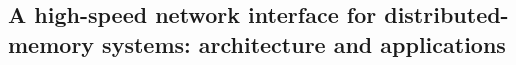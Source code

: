 
\subsection{A high-speed network interface for distributed-memory systems: architecture and applications \cite{steenkiste1997high}} \label{ss:steenkiste1997high}




